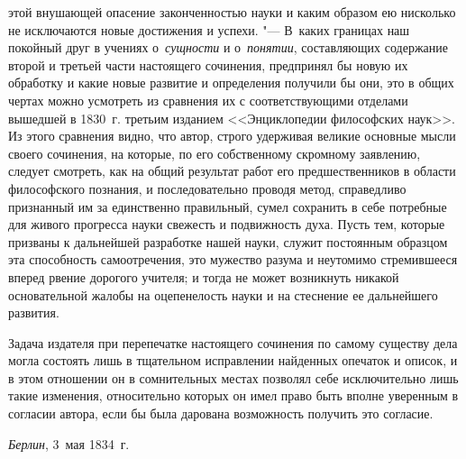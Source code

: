 этой внушающей опасение законченностью науки и каким образом ею нисколько не
исключаются новые достижения и успехи. "--- В~каких границах наш покойный друг
в учениях о~{\em сущности} и о~{\em понятии}, составляющих содержание второй и
третьей части настоящего сочинения, предпринял бы новую их обработку и какие
новые развитие и определения получили бы они, это в общих чертах можно
усмотреть из сравнения их с соответствующими отделами вышедшей в 1830~г.
третьим изданием <<Энциклопедии философских наук>>. Из этого сравнения видно,
что автор, строго удерживая великие основные мысли своего сочинения, на
которые, по его собственному скромному заявлению, следует смотреть, как на
общий результат работ его предшественников в области философского познания, и
последовательно проводя метод, справедливо признанный им за единственно
правильный, сумел сохранить в себе потребные для живого прогресса науки
свежесть и подвижность духа. Пусть тем, которые призваны к дальнейшей
разработке нашей науки, служит постоянным образцом эта способность
самоотречения, это мужество разума и неутомимо стремившееся вперед рвение
дорогого учителя; и тогда не может возникнуть никакой основательной жалобы на
оцепенелость науки и на стеснение ее дальнейшего развития.

Задача издателя при перепечатке настоящего сочинения по самому существу дела
могла состоять лишь в тщательном исправлении найденных опечаток и описок, и
в этом отношении он в сомнительных местах позволял себе исключительно лишь
такие изменения, относительно которых он имел право быть вполне уверенным в
согласии автора, если бы была дарована возможность получить это согласие.

{\em Берлин}, 3~мая 1834~г.
